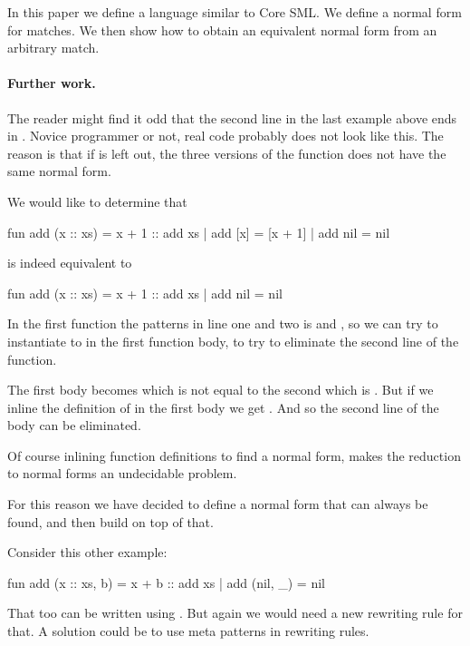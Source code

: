 In this paper we define a language similar to Core SML. We define a
normal form for matches. We then show how to obtain an equivalent normal form
from an arbitrary match.

\paragraph{Further work.}
The reader might find it odd that the second line in the last example above ends
in . Novice programmer or not, real code probably does not
look like this. The reason is that if  is left out, the three
versions of the function  does not have the same normal form.

We would like to determine that
\begin{sml}
fun add (x :: xs) = x + 1 :: add xs
  | add [x]       = [x + 1]
  | add nil       = nil
\end{sml}
is indeed equivalent to
\begin{sml}
fun add (x :: xs) = x + 1 :: add xs
  | add nil       = nil
\end{sml}
In the first function the patterns in line one and two is 
and , so we can try to instantiate  to
 in the first function body, to try to eliminate the second line
of the function.

The first body becomes  which is not equal to the
second which is . But if we inline the definition of
 in the first body we get . And so the
second line of the body can be eliminated.

Of course inlining function definitions to find a normal form, makes the
reduction to normal forms an undecidable problem.

For this reason we have decided to define a normal form that can always be
found, and then build on top of that.

Consider this other example:
\begin{sml}
fun add (x :: xs, b) = x + b :: add xs
  | add (nil, _)     = nil
\end{sml}
That too can be written using . But again we would need a new
rewriting rule for that. A solution could be to use meta patterns in rewriting
rules.


